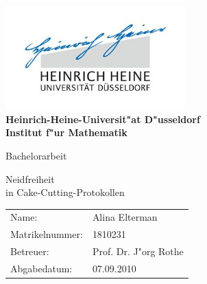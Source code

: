 \documentclass[11pt, a4paper, twoside]{article}
\numberwithin{equation}{section}
\begin{document}
\begin{titlepage}
\begin{center}
\includegraphics[height=4cm]{hhulogo.jpg}\\
\vspace{1em}
\textbf{
\Large Heinrich-Heine-Universit"at D"usseldorf\\
\smallskip
\Large Institut f"ur Mathematik\\
\smallskip}

\vspace{3em}
{\Huge Bachelorarbeit}

\vspace{4em} {\Huge Neidfreiheit \\ \vspace{1em} in Cake-Cutting-Protokollen}
\end{center}

\vfill

\begin{center}
{\large
\begin{tabular}[l]{ll}
Name: & Alina Elterman\\
Matrikelnummer: & 1810231\\
Betreuer: & Prof. Dr. J"org Rothe\\
Abgabedatum: & 07.09.2010
\end{tabular}
}
\end{center}

\end{titlepage}
\newpage

\thispagestyle{empty}
\tableofcontents

\newpage
{}
\fancyfoot[CO,CE]{\thepage}
\setcounter{page}{1}

\pagestyle{plain} %
\end{document}
